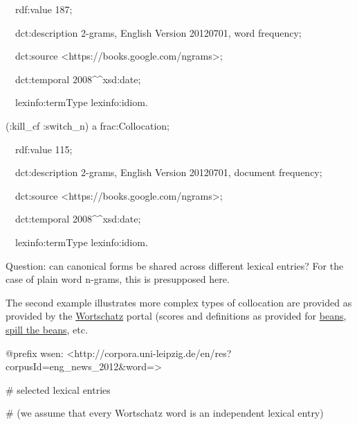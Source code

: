 \documentclass[a4paper]{article}
\newcommand\textstyleInternetlink[1]{\textcolor[rgb]{0.0,0.0,0.5019608}{#1}}
\newcommand\textstyleSourceText[1]{\textrm{#1}}
\begin{document}
\textstyleSourceText{\ \ rdf:value {\textquotedbl}187{\textquotedbl};}

\textstyleSourceText{\ \ dct:description {\textquotedbl}2-grams, English Version 20120701, word frequency{\textquotedbl};}

\textstyleSourceText{\ \ dct:source {\textless}https://books.google.com/ngrams{\textgreater};}

\textstyleSourceText{\ \ dct:temporal {\textquotedbl}2008{\textquotedbl}\^{}\^{}xsd:date;}

\textstyleSourceText{\ \ lexinfo:termType lexinfo:idiom.}


\bigskip

\textstyleSourceText{(:kill\_cf :switch\_n) a frac:Collocation;}

\textstyleSourceText{\ \ rdf:value {\textquotedbl}115{\textquotedbl};}

\textstyleSourceText{\ \ dct:description {\textquotedbl}2-grams, English Version 20120701, document frequency{\textquotedbl};}

\textstyleSourceText{\ \ dct:source {\textless}https://books.google.com/ngrams{\textgreater};}

\textstyleSourceText{\ \ dct:temporal {\textquotedbl}2008{\textquotedbl}\^{}\^{}xsd:date;}

\textstyleSourceText{\ \ lexinfo:termType lexinfo:idiom.}

Question: can canonical forms be shared across different lexical entries? For the case of plain word n-grams, this is presupposed here.

The second example illustrates more complex types of collocation are provided as provided by the \href{http://corpora.uni-leipzig.de/en/res?corpusId=eng_news_2012}{\textstyleInternetlink{Wortschatz}} portal (scores and definitions as provided for \href{http://corpora.uni-leipzig.de/en/res?corpusId=eng_news_2012&word=beans}{\textstyleInternetlink{beans}}, \href{http://corpora.uni-leipzig.de/en/res?corpusId=eng_news_2012&word=spill+the+beans}{\textstyleInternetlink{spill the beans}}, etc. 


\bigskip

\textstyleSourceText{@prefix wsen: {\textless}http://corpora.uni-leipzig.de/en/res?corpusId=eng\_news\_2012\&word={\textgreater}}


\bigskip

\textstyleSourceText{\# selected lexical entries}

\textstyleSourceText{\# (we assume that every Wortschatz word is an independent lexical entry)}
\end{document}
